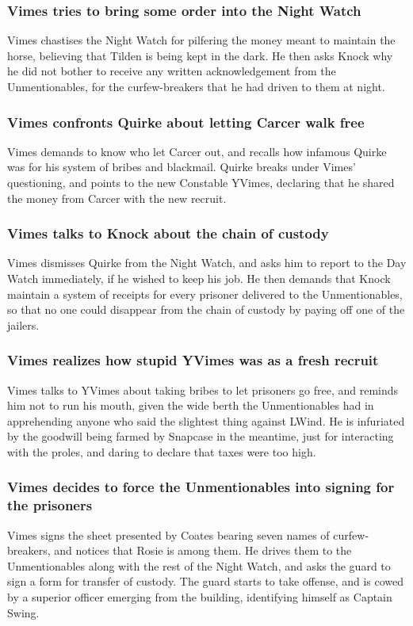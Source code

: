 \subsubsection{\Gls{Vimes} tries to bring some order into the Night Watch}
\Gls{Vimes} chastises the Night Watch for pilfering the money meant to maintain the horse, believing
that \Gls{Tilden} is being kept in the dark. He then asks \Gls{Knock} why he did not bother to
receive any written acknowledgement from the Unmentionables, for the curfew-breakers that he had
driven to them at night.

\subsubsection{\Gls{Vimes} confronts \Gls{Quirke} about letting \Gls{Carcer} walk free}
\Gls{Vimes} demands to know who let \Gls{Carcer} out, and recalls how infamous \Gls{Quirke} was
for his system of bribes and blackmail. \Gls{Quirke} breaks under \Gls{Vimes}' questioning, and
points to the new Constable \Gls{YVimes}, declaring that he shared the money from \Gls{Carcer} with
the new recruit.

\subsubsection{\Gls{Vimes} talks to \Gls{Knock} about the chain of custody}
\Gls{Vimes} dismisses \Gls{Quirke} from the Night Watch, and asks him to report to the Day Watch
immediately, if he wished to keep his job. He then demands that \Gls{Knock} maintain a system of
receipts for every prisoner delivered to the Unmentionables, so that no one could disappear from
the chain of custody by paying off one of the jailers.

\subsubsection{\Gls{Vimes} realizes how stupid \Gls{YVimes} was as a fresh recruit}
\Gls{Vimes} talks to \Gls{YVimes} about taking bribes to let prisoners go free, and reminds him not
to run his mouth, given the wide berth the Unmentionables had in apprehending anyone who said the
slightest thing against \Gls{LWind}. He is infuriated by the goodwill being farmed by \Gls{Snapcase}
in the meantime, just for interacting with the proles, and daring to declare that taxes were too
high.

\subsubsection{\Gls{Vimes} decides to force the Unmentionables into signing for the prisoners}
\Gls{Vimes} signs the sheet presented by \Gls{Coates} bearing seven names of curfew-breakers, and
notices that \Gls{Rosie} is among them. He drives them to the Unmentionables along with the rest of
the Night Watch, and asks the guard to sign a form for transfer of custody. The guard starts to
take offense, and is cowed by a superior officer emerging from the building, identifying himself
as Captain \Gls{Swing}.

